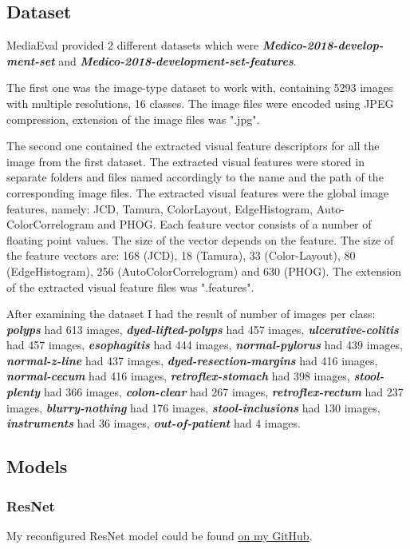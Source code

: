 \subsection{Dataset}
{MediaEval provided 2 different datasets which were \textbf{\emph{{Medico-2018-develop-ment-set}}} and \textbf{\emph{Medico-2018-development-set-features}}.

The first one was the image-type dataset to work with, containing 5293 images with multiple resolutions, 16 classes. The image files were encoded using JPEG compression\cite{jpeg}, extension of the image files was ".jpg". 

The second one contained the extracted visual feature descriptors for all the image from the first dataset. The extracted visual features were stored in separate folders and files named accordingly to the name and the path of the corresponding image files. The extracted visual features were the global image features, namely: JCD, Tamura, ColorLayout, EdgeHistogram, Auto-ColorCorrelogram and PHOG. Each feature vector consists of a number of floating point values. The size of the vector depends on the feature. The size of the feature vectors are: 168 (JCD), 18 (Tamura), 33 (Color-Layout), 80 (EdgeHistogram), 256 (AutoColorCorrelogram) and 630 (PHOG). The extension of the extracted visual feature files was ".features".

After examining the dataset I had the result of number of images per class: \textbf{\emph{polyps}} had 613 images, \textbf{\emph{dyed-lifted-polyps}} had 457 images, \textbf{\emph{ulcerative-colitis}} had 457 images, \textbf{\emph{esophagitis}} had 444 images, \textbf{\emph{normal-pylorus}} had 439 images, \textbf{\emph{normal-z-line}} had 437 images, \textbf{\emph{dyed-resection-margins}} had 416 images, \textbf{\emph{normal-cecum}} had 416 images, \textbf{\emph{retroflex-stomach}} had 398 images, \textbf{\emph{stool-plenty}} had 366 images, \textbf{\emph{colon-clear}} had 267 images, \textbf{\emph{retroflex-rectum}} had 237 images, \textbf{\emph{blurry-nothing}} had 176 images, \textbf{\emph{stool-inclusions}} had 130 images, \textbf{\emph{instruments}} had 36 images, \textbf{\emph{out-of-patient}} had 4 images.

\subsection{Models}
\subsubsection{ResNet\cite{resnet}}
My reconfigured ResNet model could be found \href{https://github.com/tlvu2697/mediaeval-18--medico-multimedia}{on my GitHub}.

}

